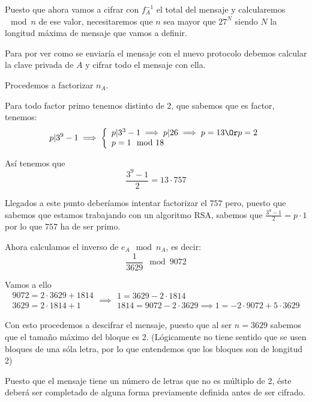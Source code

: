 \begin{problem}[5]
Puesto que ahora vamos a cifrar con $f_A^{-1}$ el total del mensaje y calcularemos $\mod n$ de ese valor, necesitaremos que $n$ sea mayor que $27^N$ siendo $N$ la longitud máxima de mensaje que vamos a definir.

\spart

Para por ver como se enviaría el mensaje con el nuevo protocolo debemos calcular la clave privada de $A$ y cifrar todo el mensaje con ella.

Procedemos a factorizar $n_A$.

Para todo factor primo tenemos distinto de $2$, que sabemos que es factor, tenemos:
\[p|3^{9}-1 \implies \left\{ \begin{array}{l}
p|3^3-1\implies p|26 \implies p =13 \Or p=2\\
p =1 \mod 18 \end{array}\right.\]

Así tenemos que
\[\frac{3^9-1}{2} = 13 \cdot 757\]

Llegados a este punto deberíamos intentar factorizar el $757$ pero, puesto que sabemos que estamos trabajando con un algoritmo RSA, sabemos que $\frac{3^9-1}{2}=p\cdot 1$ por lo que $757$ ha de ser primo.

Ahora calculamos el inverso de $e_A \mod n_A$, es decir:
\[\frac{1}{3629} \mod 9072\]

Vamos a ello
\[
\begin{array}{l}
9072 = 2 \cdot 3629 + 1814\\
3629 = 2\cdot 1814 + 1
\end{array} \implies \begin{array}{l}
1 = 3629 - 2 \cdot 1814 \\
1814 = 9072 - 2 \cdot 3629 \implies 1 = -2\cdot 9072 + 5\cdot 3629
\end{array}
\]

Con esto procedemos a descifrar el mensaje, puesto que al ser $n=3629$ sabemos que el tamaño máximo del bloque es 2. (Lógicamente no tiene sentido que se usen bloques de una sóla letra, por lo que entendemos que los bloques son de longitud 2)

Puesto que el mensaje tiene un número de letras que no es múltiplo de 2, éste deberá ser completado de alguna forma previamente definida antes de ser cifrado.

\end{problem}


